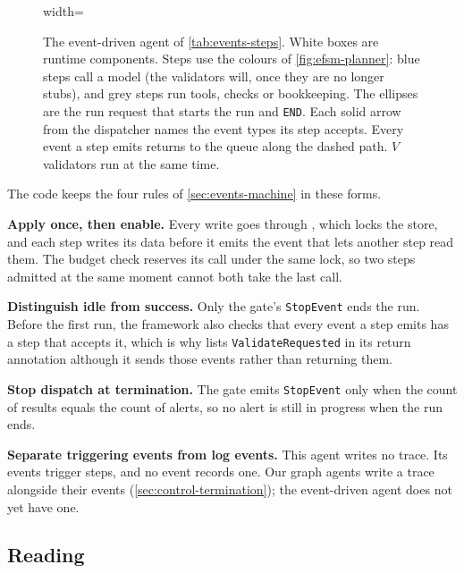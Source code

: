 \begin{figure}[tbp]
  \centering
  \begin{adjustbox}{width=\linewidth}\end{adjustbox}
  \caption{The event-driven agent of \cref{tab:events-steps}. White boxes are runtime components.
  Steps use the colours of \cref{fig:efsm-planner}: blue steps call a model (the validators will,
  once they are no longer stubs), and grey steps run tools, checks or bookkeeping. The ellipses
  are the run request that starts the run and \texttt{END}. Each solid arrow from the dispatcher
  names the event types its step accepts. Every event a step emits returns to the queue along the
  dashed path. $V$ validators run at the same time.}
  \label{fig:event-loop}
\end{figure}

The code keeps the four rules of \cref{sec:events-machine} in these forms.

\bi

\item \textbf{Apply once, then enable.} Every write goes through ,
which locks the store, and each step writes its data before it emits the event that lets another
step read them. The budget check reserves its call under the same lock, so two steps admitted at
the same moment cannot both take the last call.

\item \textbf{Distinguish idle from success.} Only the gate's \texttt{StopEvent} ends the run. Before the
first run, the framework also checks that every event a step emits has a step that accepts it,
which is why  lists \texttt{ValidateRequested} in its return annotation although it
sends those events rather than returning them.

\item \textbf{Stop dispatch at termination.} The gate emits \texttt{StopEvent} only when the count of
results equals the count of alerts, so no alert is still in progress when the run ends.

\item \textbf{Separate triggering events from log events.} This agent writes no trace. Its events trigger
steps, and no event records one. Our graph agents write a trace alongside their events
(\cref{sec:control-termination}); the event-driven agent does not yet have one.

\ei

\subsection{Reading}

